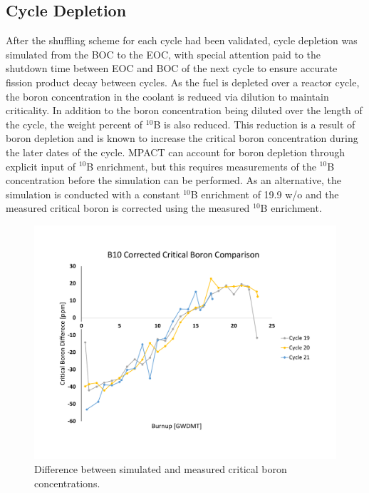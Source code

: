 \documentclass[edeposit,fullpage,11pt]{uiucthesis2009}
\begin{document}
\subsection{Cycle Depletion}
After the shuffling scheme for each cycle had been validated, cycle depletion was simulated from the \gls{BOC} to the \gls{EOC}, with special attention paid to the shutdown time between \gls{EOC} and \gls{BOC} of the next cycle to ensure accurate fission product decay between cycles. 
As the fuel is depleted over a reactor cycle, the boron concentration in the coolant is reduced via dilution to maintain criticality. 
In addition to the boron concentration being diluted over the length of the cycle, the weight percent of $^{10}$B is also reduced. 
This reduction is a result of boron depletion and is known to increase the critical boron concentration during the later dates of the cycle. 
MPACT can account for boron depletion through explicit input of $^{10}$B enrichment, but this requires measurements of the $^{10}$B concentration before the simulation can be performed.
As an alternative, the simulation is conducted with a constant $^{10}$B enrichment of 19.9 w/o and the measured critical boron is corrected using the measured $^{10}$B enrichment.
\begin{figure}
\begin{center}
\includegraphics[trim={0 2cm 0 3.1cm},clip,width=0.85\linewidth]{./Figures/corr_b.pdf}
\end{center}
\caption{Difference between simulated and measured critical boron concentrations.}
\label{fig:cor_b}
\end{figure} 
\end{document}
